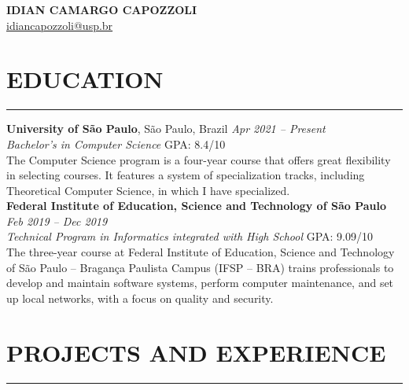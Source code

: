 \documentclass[a4paper,10pt]{article}
\begin{document}
\begin{center}
    {\LARGE \textbf{IDIAN CAMARGO CAPOZZOLI}} \\
    \vspace{0.2cm}
    \href{mailto:idiancapozzoli@usp.br}{idiancapozzoli@usp.br}

\end{center}

\section*{EDUCATION}
\vspace{-1.5em} %
\noindent\rule{\textwidth}{0.4pt} %

\noindent\textbf{University of São Paulo}, São Paulo, Brazil \hfill  \textit{Apr 2021 -- Present} \\
\textit{Bachelor's in Computer Science} \hfill GPA: 8.4/10 \\
The Computer Science program is a four-year course that offers great flexibility in selecting courses. It features a system of specialization tracks, including Theoretical Computer Science, in which I have specialized. \\

\noindent\textbf{Federal Institute of Education, Science and Technology of São Paulo} \hfill  \textit{Feb 2019 -- Dec 2019} \\
\textit{Technical Program in Informatics integrated with High School} \hfill GPA: 9.09/10 \\
The three-year course at Federal Institute of Education, Science and Technology of São Paulo -- Bragança Paulista Campus (IFSP -- BRA) trains professionals to develop and maintain software systems, perform computer maintenance, and set up local networks, with a focus on quality and security.


\section*{PROJECTS AND EXPERIENCE}
\vspace{-1.5em} %
\noindent\rule{\textwidth}{0.4pt} %
\end{document}
